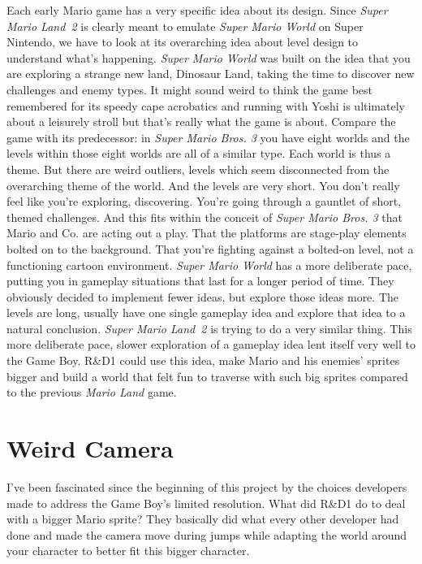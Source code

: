 \documentclass{book}
\begin{document}
Each early Mario game has a very specific idea about its design. Since \emph{Super Mario Land 2} is clearly meant to emulate \emph{Super Mario World} on Super Nintendo, we have to look at its overarching idea about level design to understand what’s happening. \emph{Super Mario World} was built on the idea that you are exploring a strange new land, Dinosaur Land, taking the time to discover new challenges and enemy types. It might sound weird to think the game best remembered for its speedy cape acrobatics and running with Yoshi is ultimately about a leisurely stroll but that’s really what the game is about. Compare the game with its predecessor: in \emph{Super Mario Bros. 3} you have eight worlds and the levels within those eight worlds are all of a similar type. Each world is thus a theme. But there are weird outliers, levels which seem disconnected from the overarching theme of the world. And the levels are very short. You don’t really feel like you’re exploring, discovering. You’re going through a gauntlet of short, themed challenges. And this fits within the conceit of \emph{Super Mario Bros. 3} that Mario and Co. are acting out a play. That the platforms are stage-play elements bolted on to the background. That you’re fighting against a bolted-on level, not a functioning cartoon environment. \emph{Super Mario World} has a more deliberate pace, putting you in gameplay situations that last for a longer period of time. They obviously decided to implement fewer ideas, but explore those ideas more. The levels are long, usually have one single gameplay idea and explore that idea to a natural conclusion. \emph{Super Mario Land 2} is trying to do a very similar thing. This more deliberate pace, slower exploration of a gameplay idea lent itself very well to the Game Boy. R\&D1 could use this idea, make Mario and his enemies’ sprites bigger and build a world that felt fun to traverse with such big sprites compared to the previous \emph{Mario Land} game.

\FloatBarrier\needspace{10mm}\section*{Weird Camera}\nopagebreak[4]

I’ve been fascinated since the beginning of this project by the choices developers made to address the Game Boy’s limited resolution. What did R\&D1 do to deal with a bigger Mario sprite? They basically did what every other developer had done and made the camera move during jumps while adapting the world around your character to better fit this bigger character.
\end{document}
